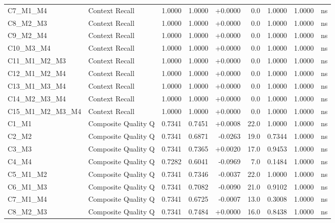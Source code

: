 \begin{table}[p]
\begin{tabular*}{\textwidth}{@{\extracolsep{\fill}} l l r r r r r r c @{}}
\addlinespace
C7\_M1\_M4      & Context Recall       & 1.0000 & 1.0000 & +0.0000 & 0.0 & 1.0000 & 1.0000 & ns \\
\addlinespace
C8\_M2\_M3      & Context Recall       & 1.0000 & 1.0000 & +0.0000 & 0.0 & 1.0000 & 1.0000 & ns \\
\addlinespace
C9\_M2\_M4      & Context Recall       & 1.0000 & 1.0000 & +0.0000 & 0.0 & 1.0000 & 1.0000 & ns \\
\addlinespace
C10\_M3\_M4     & Context Recall       & 1.0000 & 1.0000 & +0.0000 & 0.0 & 1.0000 & 1.0000 & ns \\
\addlinespace
C11\_M1\_M2\_M3 & Context Recall       & 1.0000 & 1.0000 & +0.0000 & 0.0 & 1.0000 & 1.0000 & ns \\
\addlinespace
C12\_M1\_M2\_M4 & Context Recall       & 1.0000 & 1.0000 & +0.0000 & 0.0 & 1.0000 & 1.0000 & ns \\
\addlinespace
C13\_M1\_M3\_M4 & Context Recall       & 1.0000 & 1.0000 & +0.0000 & 0.0 & 1.0000 & 1.0000 & ns \\
\addlinespace
C14\_M2\_M3\_M4 & Context Recall       & 1.0000 & 1.0000 & +0.0000 & 0.0 & 1.0000 & 1.0000 & ns \\
\addlinespace
C15\_M1\_M2\_M3\_M4 & Context Recall       & 1.0000 & 1.0000 & +0.0000 & 0.0 & 1.0000 & 1.0000 & ns \\
\addlinespace
C1\_M1          & Composite Quality Q  & 0.7341 & 0.7451 & +0.0008 & 22.0 & 1.0000 & 1.0000 & ns \\
\addlinespace
C2\_M2          & Composite Quality Q  & 0.7341 & 0.6871 & -0.0263 & 19.0 & 0.7344 & 1.0000 & ns \\
\addlinespace
C3\_M3          & Composite Quality Q  & 0.7341 & 0.7365 & +0.0020 & 17.0 & 0.9453 & 1.0000 & ns \\
\addlinespace
C4\_M4          & Composite Quality Q  & 0.7282 & 0.6041 & -0.0969 & 7.0 & 0.1484 & 1.0000 & ns \\
\addlinespace
C5\_M1\_M2      & Composite Quality Q  & 0.7341 & 0.7346 & -0.0037 & 22.0 & 1.0000 & 1.0000 & ns \\
\addlinespace
C6\_M1\_M3      & Composite Quality Q  & 0.7341 & 0.7082 & -0.0090 & 21.0 & 0.9102 & 1.0000 & ns \\
\addlinespace
C7\_M1\_M4      & Composite Quality Q  & 0.7341 & 0.6725 & -0.0007 & 13.0 & 0.3008 & 1.0000 & ns \\
\addlinespace
C8\_M2\_M3      & Composite Quality Q  & 0.7341 & 0.7484 & +0.0000 & 16.0 & 0.8438 & 1.0000 & ns \\

\end{tabular*}
\end{table}
